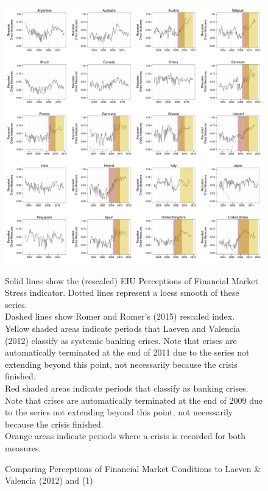 \documentclass[]{article}
\begin{document}
\begin{figure}
    \caption{Comparing Perceptions of Financial Market Conditions to Laeven \& Valencia (2012) and \cite{Reinhart2009} (1)}
    \label{compare_1}
    \begin{center}
        \includegraphics[scale=0.4]{analysis/figures/compare_to_lv_rr.pdf}
    \end{center}

    {\tiny{Solid lines show the (rescaled) EIU Perceptions of Financial Market Stress indicator. Dotted lines represent a loess smooth of these series. \\

    Dashed lines show Romer and Romer's (2015) rescaled index. \\

    Yellow shaded areas indicate periods that Laeven and Valencia (2012) classify as systemic banking crises. Note that crises are automatically terminated at the end of 2011 due to the series not extending beyond this point, not necessarily because the crisis finished. \\

    Red shaded areas indicate periods that \cite{Reinhart2009} classify as banking crises. Note that crises are automatically terminated at the end of 2009 due to the series not extending beyond this point, not necessarily because the crisis finished. \\

    Orange areas indicate periods where a crisis is recorded for both measures.}}
\end{figure}
\end{document}
